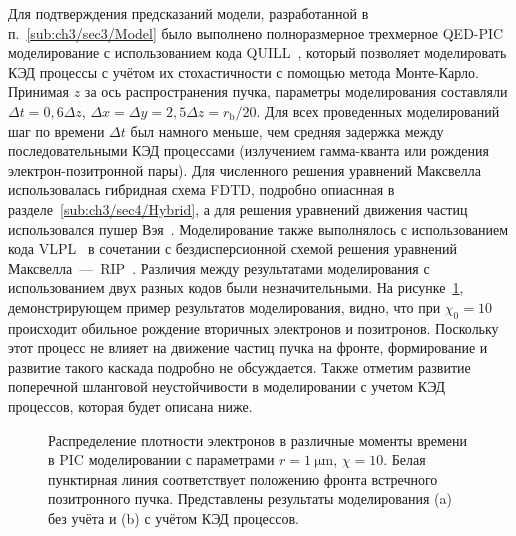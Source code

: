 Для подтверждения предсказаний модели, разработанной в п.~\ref{sub:ch3/sec3/Model} было выполнено полноразмерное трехмерное QED-PIC моделирование с использованием кода QUILL~\cite{QUILL}, который позволяет моделировать КЭД процессы с учётом их стохастичности с помощью метода Монте-Карло.
Принимая $z$ за ось распространения пучка, параметры моделирования составляли $\Delta t = 0,6 \Delta z$, $\Delta x = \Delta y = 2,5 \Delta z = r_\mathrm{b} / 20$.
Для всех проведенных моделирований шаг по времени $\Delta t$ был намного меньше, чем средняя задержка между последовательными КЭД процессами (излучением гамма-кванта или рождения электрон-позитронной пары).
Для численного решения уравнений Максвелла использовалась гибридная схема FDTD, подробно опиаснная в разделе~\ref{sub:ch3/sec4/Hybrid}, а для решения уравнений движения частиц использовался пушер Вэя~\cite{Vay08}.
Моделирование также выполнялось с использованием кода VLPL~\cite{pukhov1999three,NDFX,PhysRevE_94_063204} в сочетании с бездисперсионной схемой решения уравнений Максвелла~---~RIP~\cite{Pukhov2019}.
Различия между результатами моделирования с использованием двух разных кодов были незначительными.
На рисунке~\ref{fig:ch3/densities}, демонстрирующем пример результатов моделирования, видно, что при $\chi_0 = 10$ происходит обильное рождение вторичных электронов и позитронов.
Поскольку этот процесс не влияет на движение частиц пучка на фронте, формирование и развитие такого каскада подробно не обсуждается.
Также отметим развитие поперечной шланговой неустойчивости в моделировании с учетом КЭД процессов, которая будет описана ниже.

\begin{figure}[ht]
    \caption[Распределение плотности электронов в различные моменты времени в PIC моделировании столкновения электронного и позитронного пучков]{\label{fig:ch3/densities} 
    Распределение плотности электронов в различные моменты времени в PIC моделировании с параметрами $r = \SI{1}{\um}$, $\chi = 10$. 
    Белая пунктирная линия соответствует положению фронта встречного позитронного пучка.
    Представлены результаты моделирования (a) без учёта и (b) с учётом КЭД процессов.}
\end{figure}

